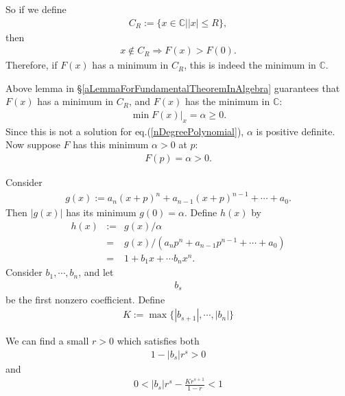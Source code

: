 \documentclass[11pt]{book}
\begin{document}
So if we define 
\begin{eqnarray}
C_R := \{x \in \mathbb{C} | |x| \leq R\},
\end{eqnarray}
then
\begin{eqnarray}
x \notin C_R \Rightarrow F(x) > F(0).
\end{eqnarray}
Therefore, if $F(x)$ has a minimum in $C_R$, this is indeed the minimum in $\mathbb{C}$.

Above lemma in \S\ref{aLemmaForFundamentalTheoremInAlgebra} guarantees that $F(x)$ has a minimum in $C_R$, and $F(x)$ has the minimum in $\mathbb{C}$:
\begin{eqnarray}
\min \left. F(x) \right|_x = \alpha \geq 0.
\end{eqnarray}
Since this is not a solution for eq.(\ref{nDegreePolynomial}), $\alpha$ is positive definite.
Now suppose $F$ has this minimum $\alpha>0$ at $p$:
\begin{eqnarray}
F(p) = \alpha > 0.
\end{eqnarray}

Consider
\begin{eqnarray}
g(x) := a_n (x+p)^n + a_{n-1} (x+p)^{n-1} + \cdots + a_0.
\end{eqnarray}
Then $|g(x)|$ has its minimum $g(0) = \alpha$.
Define $h(x)$ by 
\begin{eqnarray}
h(x)&:=& g(x)/\alpha\\ 
&=& g(x) / (a_n p^n + a_{n-1} p^{n-1} + \cdots + a_0) \\
&=& 1 + b_1 x + \cdots b_n x^n.
\end{eqnarray}
Consider $b_1, \cdots, b_n$, and let
\begin{eqnarray}
b_s
\end{eqnarray}
be the first nonzero coefficient.
Define
\begin{eqnarray}
K := \max \{ |b_{s+1}|, \cdots, |b_n| \}
\end{eqnarray}

We can find a small $r>0$ which satisfies both
\begin{eqnarray}
1 - |b_s| r^s > 0
\end{eqnarray}
and
\begin{eqnarray}
0 < |b_s| r^s - \frac{K r^{s+1}}{1-r} < 1
\end{eqnarray}
\end{document}
